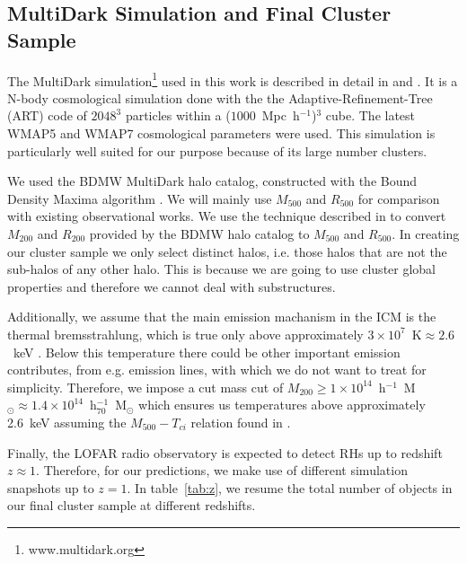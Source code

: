 \documentclass[traditabstract]{aa}
\newcommand{\rmn}{\mathrm}
\begin{document}
\subsection{MultiDark Simulation and Final Cluster Sample}
\label{sec:2.1}
The MultiDark simulation\footnote[3]{www.multidark.org} used in this work is described in 
detail in \cite{2011arXiv1104.5130P} and \cite{2011arXiv1109.0003R}.  It is a N-body cosmological simulation 
done with the the Adaptive-Refinement-Tree (ART) code \citep{1997ApJS..111...73K} of $2048^3$ particles within
a ($1000$~Mpc~h$^{-1}$)$^3$ cube. The latest WMAP5 and WMAP7 cosmological parameters 
were used. This simulation is particularly  well suited for our purpose because of its large number clusters. 
 
We used the BDMW MultiDark halo catalog, constructed with the Bound Density Maxima algorithm \citep{1997astro.ph.12217K}.
We will mainly use $M_{500}$ and $R_{500}$ for comparison with existing observational works. 
We use the technique described in \cite{2003ApJ...584..702H} to convert $M_{200}$ and $R_{200}$ provided by the BDMW halo catalog to $M_{500}$ and $R_{500}$.
In creating our cluster sample we only select distinct halos, i.e. those halos that are not the sub-halos
of any other halo. This is because we are going to use cluster global properties and therefore we cannot
deal with substructures.

Additionally, we assume that the main emission machanism in the ICM is the thermal bremsstrahlung, which is true only above approximately $3\times10^{7}$~$\rmn{K}\approx2.6$~keV \citep{1988xrec.book.....S}. Below this temperature there could be other important emission contributes, from e.g. emission lines, with which we do not want to treat for simplicity. Therefore, we impose a cut mass cut of $M_{200}\geq1\times10^{14}$~h$^{-1}$~M$_{\odot}\approx1.4\times10^{14}$~h$_{70}^{-1}$~M$_{\odot}$ which ensures us temperatures above approximately 2.6~keV assuming the $M_{500} - T_{ci}$ relation found in \cite{2010MNRAS.406.1773M}.

Finally, the LOFAR radio observatory is expected to detect RHs up to redshift $z \approx 1$. Therefore, for our predictions, we make use of different simulation snapshots up
to $z=1$. In table~\ref{tab:z}, we resume the total number of objects in our final cluster sample at different redshifts.
\end{document}
